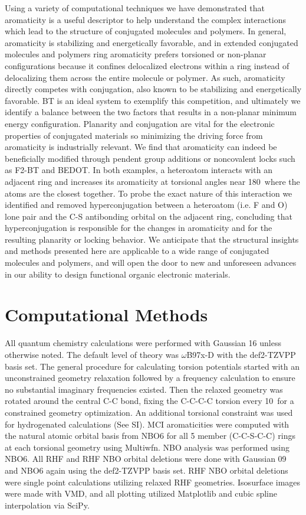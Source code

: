 Using a variety of computational techniques we have demonstrated that aromaticity is a useful descriptor to help understand the complex interactions which lead to the structure of conjugated molecules and polymers. In general, aromaticity is stabilizing and energetically favorable, and in extended conjugated molecules and polymers ring aromaticity prefers torsioned or non-planar configurations because it confines delocalized electrons within a ring instead of delocalizing them across the entire molecule or polymer. As such, aromaticity directly competes with conjugation, also known to be stabilizing and energetically favorable. BT is an ideal system to exemplify this competition, and ultimately we identify a balance between the two factors that results in a non-planar minimum energy configuration. Planarity and conjugation are vital for the electronic properties of conjugated materials so minimizing the driving force from aromaticity is industrially relevant. We find that aromaticity can indeed be beneficially modified through pendent group additions or noncovalent locks such as F2-BT and BEDOT. In both examples, a heteroatom interacts with an adjacent ring and increases its aromaticity at torsional angles near 180\textdegree \ where the atoms are the closest together. To probe the exact nature of this interaction we identified and removed hyperconjugation between a heteroatom (i.e. F and O) lone pair and the C-S antibonding orbital on the adjacent ring, concluding that hyperconjugation is responsible for the changes in aromaticity and for the resulting planarity or locking behavior. We anticipate that the structural insights and methods presented here are applicable to a wide range of conjugated molecules and polymers, and will open the door to new and unforeseen advances in our ability to design functional organic electronic materials.

\section{Computational Methods}

All quantum chemistry calculations were performed with Gaussian 16 unless otherwise noted.\cite{g16} The default level of theory was $\omega$B97x-D with the def2-TZVPP basis set.\cite{Chai2008, Weigend2005} The general procedure for calculating torsion potentials started with an unconstrained geometry relaxation followed by a frequency calculation to ensure no substantial imaginary frequencies existed. Then the relaxed geometry was rotated around the central C-C bond, fixing the C-C-C-C torsion every 10\textdegree \ for a constrained geometry optimization. An additional torsional constraint was used for hydrogenated calculations (See SI). MCI aromaticities were computed with the natural atomic orbital basis from NBO6 for all 5 member (C-C-S-C-C) rings at each torsional geometry using Multiwfn.\cite{Lu2012} NBO analysis was performed using NBO6.\cite{NBO6} All RHF and RHF NBO orbital deletions were done with Gaussian 09\cite{g09} and NBO6 again using the def2-TZVPP basis set. RHF NBO orbital deletions were single point calculations utilizing relaxed RHF geometries. Isosurface images were made with VMD,\cite{HUMP96} and all plotting utilized Matplotlib and cubic spline interpolation via SciPy.\cite{Jones} 